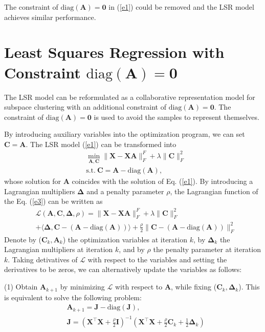 \documentclass[10pt,twocolumn,letterpaper]{article}
\begin{document}
The constraint of  $\text{diag}(\bm{A})=\bm{0}$ in (\ref{e1}) could be removed and the LSR model achieves similar performance.


\section{Least Squares Regression with Constraint $\text{diag}(\bm{A})=\bm{0}$}
The LSR model can be reformulated as a collaborative representation model \cite{crc} for subspace clustering with an additional constraint of $\text{diag}(\bm{A})=\bm{0}$. The constraint of $\text{diag}(\bm{A})=\bm{0}$ is used to avoid the samples to represent themselves.

By introducing auxiliary variables into the optimization program, we can set 
$
\bm{C}
=
\bm{A}
$.
The LSR model (\ref{e1}) can be transformed into
\begin{equation}
\begin{split}
\label{e5}
&
\min_{\bm{A},\bm{C}}
\|
\bm{X}
-
\bm{X}\bm{A}
\|_{F}^{F}
+
\lambda
\|
\bm{C}
\|_{F}^{2}
\\
& 
\text{s.t.}
\ 
\bm{C}=\bm{A}-\text{diag}(\bm{A})
,
\end{split}
\end{equation}
whose solution for $\bm{A}$ coincides with the solution of Eq. (\ref{e1}). By introducing a Lagrangian multipliers $\bm{\Delta}$ and a penalty parameter $\rho$, the Lagrangian function of the Eq. (\ref{e3}) can be written as
\begin{equation}
\begin{split}
\label{e6}
&
\mathcal{L}
(\bm{A},\bm{C},\bm{\Delta},\rho)
=
\|
\bm{X}
-
\bm{X}\bm{A}
\|_{F}^{F}
+
\lambda
\|
\bm{C}
\|_{F}^{2}
\\
&
+
\langle
\bm{\Delta},
\bm{C}-(\bm{A}-\text{diag}(\bm{A}))
\rangle
+
\frac{\rho}{2}
\|
\bm{C}-(\bm{A}-\text{diag}(\bm{A}))
\|_{F}^{2}
\end{split}
\end{equation}
Denote by ($\bm{C}_{k},\bm{A}_{k}$) the optimization variables at iteration $k$, by $\bm{\Delta}_{k}$ the Lagrangian multipliers at iteration $k$, and by $\rho$ the penalty parameter at iteration $k$. Taking detivatives of $\mathcal{L}$ with respect to the variables and setting the derivatives to be zeros, we can alternatively update the variables as follows:

(1) Obtain $\bm{A}_{k+1}$ by minimizing $\mathcal{L}$ with respect to $\bm{A}$, while fixing ($\bm{C}_{k},\bm{\Delta}_{k}$). This is equivalent to solve the following problem:
\begin{equation}
\begin{split}
\label{e7}
&
\bm{A}_{k+1}
=
\bm{J}-\text{diag}(\bm{J}),
\\
&
\bm{J}
=
(\bm{X}^{\top}\bm{X}+\frac{\rho}{2}\bm{I})^{-1}
(\bm{X}^{\top}\bm{X}+\frac{\rho}{2}\bm{C}_{k}+\frac{1}{2}\bm{\Delta}_{k})
\end{split}
\end{equation}
\end{document}
